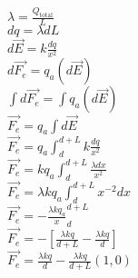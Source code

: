 \documentclass[10pt, a4paper]{article}
\begin{document}
\begin{enumerate}
        \begin{center}
            $\lambda=\frac{Q_{\text{total}}}{L}$\\
            $dq = \lambda dL$\\
            $d\vec{E}=k\frac{dq}{x^2}$\\
            $d\vec{F_e}=q_a(d\vec{E})$\\
            $\int d\vec{F_e}=\int q_a(d\vec{E})$\\
            $\vec{F_e}= q_a\int{d\vec{E}}$\\
            $\vec{F_e}=q_a\int_{d}^{d+L}k\frac{dq}{x^2}$\\
            $\vec{F_e}=kq_a\int_{d}^{d+L}\frac{\lambda dx}{x^2}$\\
            $\vec{F_e}=\lambda kq_a\int_{d}^{d+L}{x^{-2}dx}$\\
            $\vec{F_e}=-\frac{\lambda kq_a}{x}_d^{d+L}$\\
            $\vec{F_e}=-[\frac{\lambda kq}{d+L}-\frac{\lambda kq}{d}]$\\
            $\vec{F_e}=\frac{\lambda kq}{d}-\frac{\lambda kq}{d+L}(1,0)$

        \end{center}

    \end{enumerate}
\end{document}
